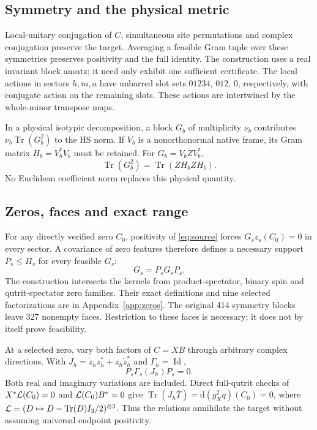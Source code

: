 \documentclass[11pt,a4paper]{article}
\theoremstyle{definition}\newtheorem{definition}[theorem]{Definition}
\theoremstyle{remark}\newtheorem{remark}[theorem]{Remark}
\DeclareMathOperator{\Tr}{Tr}\DeclareMathOperator{\rank}{rank}
\newcommand{\dd}{\mathrm d}
\numberwithin{equation}{section}
\begin{document}
\subsection{Symmetry and the physical metric}
Local-unitary conjugation of $C$, simultaneous site permutations
and complex conjugation preserve the target. Averaging a feasible
Gram tuple over these symmetries preserves positivity and the full
identity. The construction uses a real invariant block ansatz; it
need only exhibit one sufficient certificate.
The local actions in sectors $h,m,a$ have unbarred slot sets
$01234$, $012$, $0$, respectively, with conjugate action on the
remaining slots. These actions are intertwined by the whole-minor
transpose maps.

In a physical isotypic decomposition, a block $G_b$ of multiplicity
$\nu_b$ contributes $\nu_b\Tr(G_b^2)$ to the HS norm.
If $V_b$ is a nonorthonormal native frame, its Gram matrix
$H_b=V_b^*V_b$ must be retained. For $G_b=V_bZV_b^*$,
\[
\Tr(G_b^2)=\Tr(ZH_bZH_b).
\]
No Euclidean coefficient norm replaces this physical quantity.

\subsection{Zeros, faces and exact range}
For any directly verified zero $C_0$, positivity of
\eqref{eq:source} forces $G_sz_s(C_0)=0$ in every sector.
A covariance of zero features therefore defines a necessary support
$P_s\le\Pi_s$ for every feasible $G_s$:
\[
G_s=P_sG_sP_s.
\]
The construction intersects the kernels from product-spectator,
binary spin and qutrit-spectator zero families. Their exact
definitions and nine selected factorizations are in
Appendix~\ref{app:zeros}. The original 414 symmetry blocks leave
327 nonempty faces. Restriction to these faces is necessary; it
does not by itself prove feasibility.

At a selected zero, vary both factors of $C=XB$ through arbitrary
complex directions. With
$J_h=\dot z_hz_h^*+z_h\dot z_h^*$ and $\Gamma_h=\operatorname{Id}$,
\begin{equation}
P_s\Gamma_s(J_h)P_s=0.
\label{eq:relations}
\end{equation}
Both real and imaginary variations are included. Direct full-qutrit
checks of $X^*\mathcal L(C_0)=0$ and $\mathcal L(C_0)B^*=0$ give
$\Tr(J_h\overline T)=\dd(g_X^2q)(C_0)=0$, where
$\LL=(D\mapsto D-\Tr(D)I_3/2)^{\otimes3}$.
Thus the relations annihilate the target without assuming universal
endpoint positivity.
\end{document}
